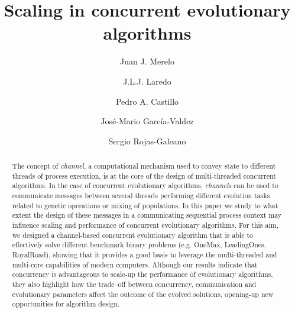 \documentclass[runningheads]{llncs}\usepackage[]{graphicx}\usepackage[]{color}
\begin{document}
\title{Scaling in concurrent evolutionary algorithms}


 \author{Juan J. Merelo
 \and
 J.L.J. Laredo
 \and
 Pedro A. Castillo
 \and
 Jos\'e-Mario Garc\'ia-Valdez
\and
Sergio Rojas-Galeano
}



\maketitle

\begin{abstract}
The concept of \emph{channel}, a computational mechanism
used to convey state to different threads of process execution,
is at the core of the design of multi-threaded concurrent
algorithms. In the case of concurrent evolutionary
algorithms, \emph{channels} can be used to communicate messages 
between several threads performing different evolution tasks 
related to genetic operations or mixing of
populations. In this paper we study to what extent the
design of these messages in a communicating sequential process
context may influence scaling and performance of concurrent
evolutionary algorithms. For this aim, we designed a channel-based
concurrent evolutionary algorithm that is able to effectively solve
different benchmark binary problems (e.g. OneMax, LeadingOnes,
RoyalRoad), showing that it provides a good basis to leverage the
multi-threaded and multi-core capabilities of modern
computers. Although our results indicate that concurrency is
advantageous to scale-up the performance of evolutionary algorithms,
they also highlight how the trade--off between concurrency,
communication and evolutionary parameters affect the outcome of the
evolved solutions, opening-up new opportunities for algorithm design. 
\end{abstract}
\end{document}
